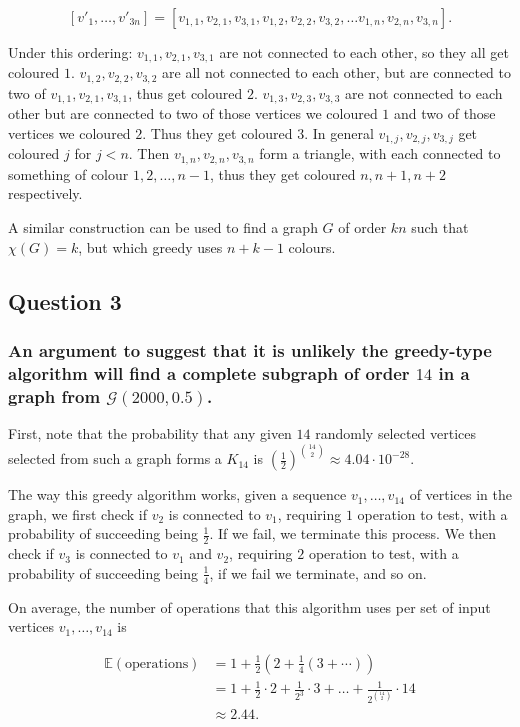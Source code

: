 \documentclass{article}
\begin{document}
$$[v'_1, \dots, v'_{3n}] = [v_{1,1}, v_{2,1}, v_{3,1}, v_{1,2}, v_{2,2}, v_{3,2}, \dots v_{1,n}, v_{2,n}, v_{3,n}].$$

Under this ordering: $v_{1,1}, v_{2,1}, v_{3,1}$ are not connected to each other, so they all get coloured $1$. $v_{1,2}, v_{2,2}, v_{3,2}$ are all not connected to each other, but are connected to two of $v_{1,1}, v_{2,1}, v_{3,1}$, thus get coloured $2$. $v_{1,3}, v_{2,3}, v_{3,3}$ are not connected to each other but are connected to two of those vertices we coloured $1$ and two of those vertices we coloured $2$. Thus they get coloured $3$. In general $v_{1,j}, v_{2,j}, v_{3,j}$ get coloured $j$ for $j<n$. Then $v_{1,n}, v_{2,n}, v_{3,n}$ form a triangle, with each connected to something of colour $1, 2, \dots, n-1$, thus they get coloured $n, n+1, n+2$ respectively.

A similar construction can be used to find a graph $G$ of order $kn$ such that $\chi(G) = k$, but which greedy uses $n+k-1$ colours.

\subsection{Question 3}

\subsubsection{An argument to suggest that it is unlikely the greedy-type algorithm will find a complete subgraph of order $14$ in a graph from $\mathcal{G}(2000, 0.5)$.}

First, note that the probability that any given $14$ randomly selected vertices selected from such a graph forms a $K_{14}$ is $\left( \frac{1}{2} \right)^{\binom{14}{2}} \approx 4.04 \cdot 10^{-28}$.

The way this greedy algorithm works, given a sequence $v_1, \dots, v_{14}$ of vertices in the graph, we first check if $v_2$ is connected to $v_1$, requiring $1$ operation to test, with a probability of succeeding being $\frac{1}{2}$. If we fail, we terminate this process. We then check if $v_3$ is connected to $v_1$ and $v_2$, requiring $2$ operation to test, with a probability of succeeding being $\frac{1}{4}$, if we fail we terminate, and so on.

On average, the number of operations that this algorithm uses per set of input vertices $v_1, \dots, v_{14}$ is

$$\begin{aligned}
	\mathbb{E}(\text{operations}) &= 1 + \frac{1}{2}(2 + \frac{1}{4}(3 + \cdots)) \\
	&= 1 + \frac{1}{2} \cdot 2 + \frac{1}{2^3} \cdot 3 + \dots + \frac{1}{2^{\binom{14}{2}}} \cdot 14 \\
	&\approx 2.44.
\end{aligned}$$
\end{document}
